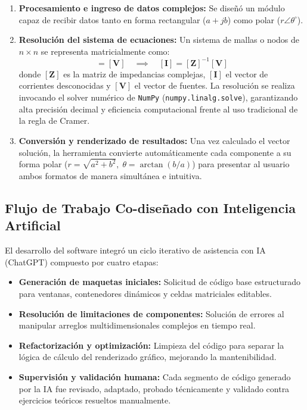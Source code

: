 \documentclass[12pt,a4paper]{article}
\begin{document}
\begin{enumerate}
    \item \textbf{Procesamiento e ingreso de datos complejos:} Se diseñó un módulo capaz de recibir datos tanto en forma rectangular ($a + jb$) como polar ($r\angle\theta^\circ$).

    \item \textbf{Resolución del sistema de ecuaciones:} Un sistema de mallas o nodos de $n \times n$ se representa matricialmente como:
    \begin{equation}
        [\mathbf{Z}] [\mathbf{I}] = [\mathbf{V}] \quad \implies \quad [\mathbf{I}] = [\mathbf{Z}]^{-1} [\mathbf{V}]
    \end{equation}
    donde $[\mathbf{Z}]$ es la matriz de impedancias complejas, $[\mathbf{I}]$ el vector de corrientes desconocidas y $[\mathbf{V}]$ el vector de fuentes. La resolución se realiza invocando el solver numérico de \texttt{NumPy} (\texttt{numpy.linalg.solve}), garantizando alta precisión decimal y eficiencia computacional frente al uso tradicional de la regla de Cramer.

    \item \textbf{Conversión y renderizado de resultados:} Una vez calculado el vector solución, la herramienta convierte automáticamente cada componente a su forma polar ($r = \sqrt{a^2 + b^2}, \; \theta = \arctan(b/a)$) para presentar al usuario ambos formatos de manera simultánea e intuitiva.
\end{enumerate}

\subsection{Flujo de Trabajo Co-diseñado con Inteligencia Artificial}
El desarrollo del software integró un ciclo iterativo de asistencia con IA (ChatGPT) compuesto por cuatro etapas:
\begin{itemize}
    \item \textbf{Generación de maquetas iniciales:} Solicitud de código base estructurado para ventanas, contenedores dinámicos y celdas matriciales editables.
    \item \textbf{Resolución de limitaciones de componentes:} Solución de errores al manipular arreglos multidimensionales complejos en tiempo real.
    \item \textbf{Refactorización y optimización:} Limpieza del código para separar la lógica de cálculo del renderizado gráfico, mejorando la mantenibilidad.
    \item \textbf{Supervisión y validación humana:} Cada segmento de código generado por la IA fue revisado, adaptado, probado técnicamente y validado contra ejercicios teóricos resueltos manualmente.
\end{itemize}
\end{document}
